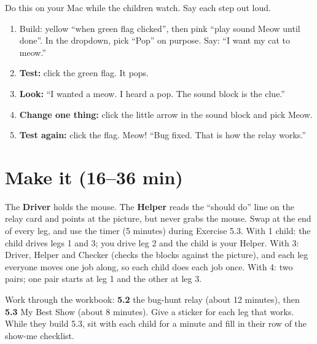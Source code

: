 \begin{workedexample}
Do this on your Mac while the children watch. Say each step out loud.
\begin{enumerate}[leftmargin=1.4em,itemsep=1pt]
  \item Build: yellow  \enquote{when green flag clicked}, then pink  \enquote{play sound Meow until done}. In the dropdown, pick \enquote{Pop} on purpose. Say: \enquote{I want my cat to meow.}
  \item \textbf{Test:} click the green flag. It pops.
  \item \textbf{Look:} \enquote{I wanted a meow. I heard a pop. The sound block is the clue.}
  \item \textbf{Change one thing:} click the little arrow in the sound block and pick Meow.
  \item \textbf{Test again:} click the flag. Meow! \enquote{Bug fixed. That is how the relay works.}
\end{enumerate}
\begin{center}
\begin{scratch}[scale=0.85]
\end{scratch}
\end{center}
\end{workedexample}

\section{Make it (16--36 min)}
\begin{pairroles}
The \textbf{Driver} holds the mouse. The \textbf{Helper} reads the \enquote{should do} line on the relay card and points at the picture, but never grabs the mouse. Swap at the end of every leg, and use the timer (5 minutes) during Exercise 5.3. With 1 child: the child drives legs 1 and 3; you drive leg 2 and the child is your Helper. With 3: Driver, Helper and Checker (checks the blocks against the picture), and each leg everyone moves one job along, so each child does each job once. With 4: two pairs; one pair starts at leg 1 and the other at leg 3.
\end{pairroles}

Work through the workbook: \textbf{5.2} the bug-hunt relay (about 12 minutes), then \textbf{5.3} My Best Show (about 8 minutes). Give a sticker for each leg that works. While they build 5.3, sit with each child for a minute and fill in their row of the show-me checklist.

